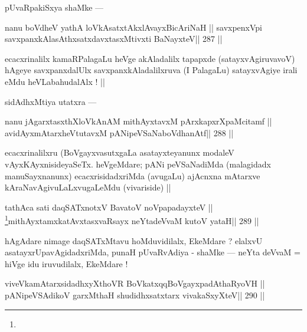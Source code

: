 \begin{artha}
pUvaRpakiSxya shaMke ---
\end{artha}

\begin{shl}
nanu boVdheV yathA loVkAsatxtAkxlAvayxBicAriNaH ||
savxpenxV\s pi savxpanxkAlasAthxsatxdavxtasxMtivxti BaNayxteV\hfill || 287 ||
\end{shl}

\begin{artha}
ecacxrinalilx kamaRPalagaLu heVge akAladalilx tapapxde (satayxvAgiruvavoV) hAgeye savxpanxdalUlx savxpanxkAladalilxruva (I PalagaLu) satayxvAgiye irali eMdu heVLabahudalAlx ! ||
\end{artha}

\begin{artha}
sidAdhxMtiya utatxra ---
\end{artha}

\begin{shl}
nanu jAgarxtasxthXloVkAnAM mithAyxtavxM pArxkapxrXpaMcitamf ||
avidAyxmAtarxheVtutavxM pANipeVSaNaboVdhanAtf\hfill || 288 ||
\end{shl}

\begin{artha}
ecacxrinalilxru (BoVgayxvasutxgaLa asatayxteyanunx modaleV 
vAyxKAyxnisideyaSeTx. heVgeMdare; pANi peVSaNadiMda (malagidadx manuSayxnanunx) ecacxrisidadxriMda (avugaLu) ajAcnxna mAtarxve kAraNavAgivuLaLxvugaLeMdu (vivariside) ||
\end{artha}

\begin{shl}
tathAca sati daqSATxnotxV BavatoV noVpapadayxteV ||
\footnote[1]{}mithAyxtamxkatAvxtasxvaRsayx neYtadeVvaM kutoV yataH\hfill || 289 ||
\end{shl}

\begin{artha}
hAgAdare nimage daqSATxMtavu hoMduvidilalx, EkeMdare ? elalxvU asatayxrUpavAgidadxriMda, punaH pUvaRvAdiya - shaMke --- neYta deVvaM = hiVge idu iruvudilalx, EkeMdare !
\end{artha}

\begin{shl}
\footnotemark[2]viveVkamAtarxsidadhxyXthoVR BoVkatxqqBoVgayxpadAthaRyoVH ||
pANipeVSAdikoV garxMthaH shudidhxsatxtarx vivakaSxyXteV\hfill || 290 ||
\end{shl}

